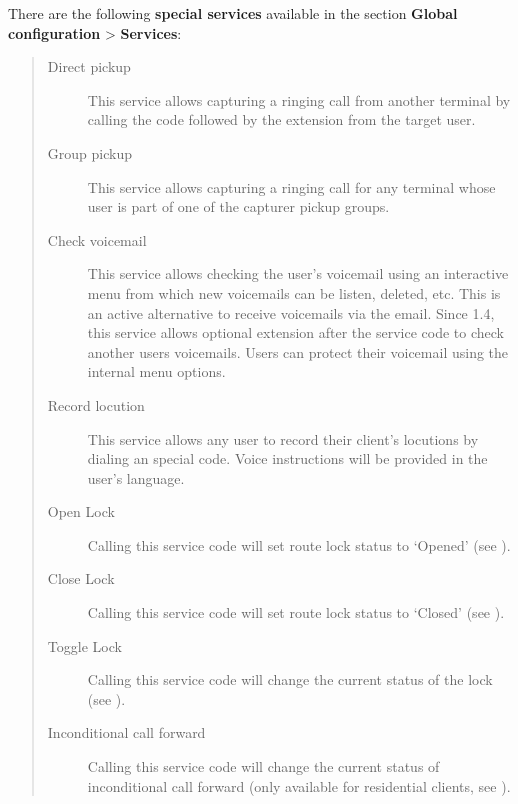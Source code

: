 \documentclass[letterpaper,10pt,english]{sphinxmanual}
\begin{document}
There are the following \textbf{special services} available in the section \textbf{Global
configuration} \textgreater{} \textbf{Services}:
\begin{quote}
\begin{description}
\item[{Direct pickup}] \leavevmode
This service allows capturing a ringing call from another terminal by
calling the code followed by the extension from the target user.

\item[{Group pickup}] \leavevmode
This service allows capturing a ringing call for any terminal whose user
is part of one of the capturer pickup groups.

\item[{Check voicemail}] \leavevmode
This service allows checking the user's voicemail using an interactive
menu from which new voicemails can be listen, deleted, etc. This is an
active alternative to receive voicemails via the email. Since 1.4, this
service allows optional extension after the service code to check
another users voicemails. Users can protect their voicemail using the
internal menu options.

\item[{Record locution}] \leavevmode
This service allows any user to record their client's locutions by
dialing an special code. Voice instructions will be provided in the
user's language.

\item[{Open Lock}] \leavevmode
Calling this service code will set route lock status to `Opened' (see {\hyperref[administration_portal/client/vpbx/routing_tools/route_locks:route\string-locks]{}}).

\item[{Close Lock}] \leavevmode
Calling this service code will set route lock status to `Closed' (see {\hyperref[administration_portal/client/vpbx/routing_tools/route_locks:route\string-locks]{}}).

\item[{Toggle Lock}] \leavevmode
Calling this service code will change the current status of the lock (see {\hyperref[administration_portal/client/vpbx/routing_tools/route_locks:route\string-locks]{}}).

\item[{Inconditional call forward}] \leavevmode
Calling this service code will change the current status of inconditional call forward (only available for
residential clients, see {\hyperref[administration_portal/client/residential/residential_devices:residential\string-devices\string-cfw]{}}).


\end{description}
\end{quote}
\end{document}
